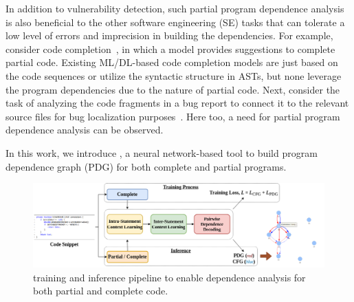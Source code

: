 In addition to vulnerability detection, such partial program dependence analysis is also beneficial to the other software engineering (SE) tasks that can tolerate a low level of errors and imprecision in building the dependencies. For example, consider code completion~\cite{codefill-icse22,facebook-icse21}, in which a model provides suggestions to complete partial code. Existing ML/DL-based code completion models are just based on the code sequences or utilize the syntactic structure in ASTs, but none leverage the program dependencies due to the nature of partial code. Next, consider the task of analyzing the code fragments in a bug report to connect it to the relevant source files for bug localization purposes~\cite{euler-fse19,icpc17}. Here too, a need for partial program dependence analysis can be observed.

In this work, we introduce \tool, a neural network-based tool to build
program dependence graph (PDG) for both complete and partial
programs. 

\begin{figure}[hbt!]
\begin{center}
    \includegraphics[width=\textwidth]{icse23-demo-figures/demo-arch3.png}
    \caption{\tool training and inference pipeline to enable dependence analysis for both partial and complete code.}
    \label{fig:model}
    \vspace{-8pt}
\end{center}
\end{figure}

